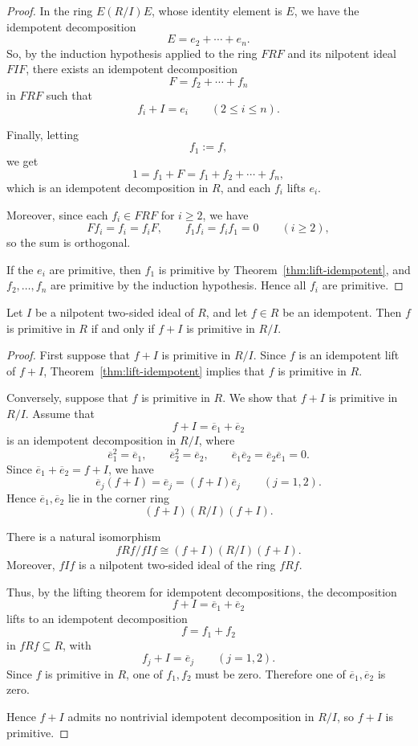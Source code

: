\begin{proof}
    In the ring $E(R/I)E$, whose identity element is $E$, we have the idempotent decomposition
    \[
        E=e_2+\cdots+e_n.
    \]
    So, by the induction hypothesis applied to the ring $FRF$ and its nilpotent ideal $FIF$,
    there exists an idempotent decomposition
    \[
        F=f_2+\cdots+f_n
    \]
    in $FRF$ such that
    \[
        f_i+I=e_i
        \qquad (2\le i\le n).
    \]

    Finally, letting
    \[
        f_1:=f,
    \]
    we get
    \[
        1=f_1+F=f_1+f_2+\cdots+f_n,
    \]
    which is an idempotent decomposition in $R$, and each $f_i$ lifts $e_i$.

    Moreover, since each $f_i\in FRF$ for $i\ge2$, we have
    \[
        Ff_i=f_i=f_iF,
        \qquad
        f_1f_i=f_i f_1=0
        \qquad (i\ge2),
    \]
    so the sum is orthogonal.

    If the $e_i$ are primitive, then $f_1$ is primitive by
    Theorem~\ref{thm:lift-idempotent}, and $f_2,\dots,f_n$ are primitive by the induction
    hypothesis. Hence all $f_i$ are primitive.
\end{proof}

\begin{corollary}\label{cor:primitive-idempotent-quotient}
    Let $I$ be a nilpotent two-sided ideal of $R$, and let $f\in R$ be an idempotent.
    Then $f$ is primitive in $R$ if and only if $f+I$ is primitive in $R/I$.
\end{corollary}

\begin{proof}
    First suppose that $f+I$ is primitive in $R/I$. Since $f$ is an idempotent lift of
    $f+I$, Theorem~\ref{thm:lift-idempotent} implies that $f$ is primitive in $R$.

    Conversely, suppose that $f$ is primitive in $R$. We show that $f+I$ is primitive in
    $R/I$. Assume that
    \[
        f+I=\overline{e}_1+\overline{e}_2
    \]
    is an idempotent decomposition in $R/I$, where
    \[
        \overline{e}_1^2=\overline{e}_1,\qquad
        \overline{e}_2^2=\overline{e}_2,\qquad
        \overline{e}_1\overline{e}_2=\overline{e}_2\overline{e}_1=0.
    \]
    Since $\overline{e}_1+\overline{e}_2=f+I$, we have
    \[
        \overline{e}_j(f+I)=\overline{e}_j=(f+I)\overline{e}_j
        \qquad (j=1,2).
    \]
    Hence $\overline{e}_1,\overline{e}_2$ lie in the corner ring
    \[
        (f+I)(R/I)(f+I).
    \]

    There is a natural isomorphism
    \[
        fRf/fIf \cong (f+I)(R/I)(f+I).
    \]
    Moreover, $fIf$ is a nilpotent two-sided ideal of the ring $fRf$.

    Thus, by the lifting theorem for idempotent decompositions, the decomposition
    \[
        f+I=\overline{e}_1+\overline{e}_2
    \]
    lifts to an idempotent decomposition
    \[
        f=f_1+f_2
    \]
    in $fRf\subseteq R$, with
    \[
        f_j+I=\overline{e}_j
        \qquad (j=1,2).
    \]
    Since $f$ is primitive in $R$, one of $f_1,f_2$ must be zero. Therefore one of
    $\overline{e}_1,\overline{e}_2$ is zero.

    Hence $f+I$ admits no nontrivial idempotent decomposition in $R/I$, so $f+I$ is
    primitive.
\end{proof}

